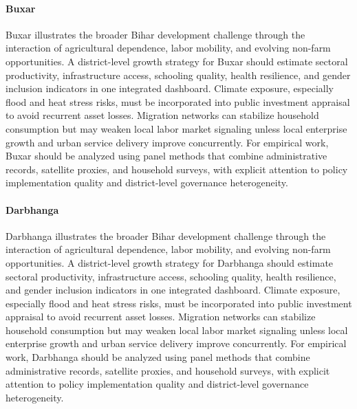 \documentclass[preprint,12pt]{elsarticle}
\begin{document}
\paragraph{Buxar} Buxar illustrates the broader Bihar development challenge through the interaction of agricultural dependence, labor mobility, and evolving non-farm opportunities. A district-level growth strategy for Buxar should estimate sectoral productivity, infrastructure access, schooling quality, health resilience, and gender inclusion indicators in one integrated dashboard. Climate exposure, especially flood and heat stress risks, must be incorporated into public investment appraisal to avoid recurrent asset losses. Migration networks can stabilize household consumption but may weaken local labor market signaling unless local enterprise growth and urban service delivery improve concurrently. For empirical work, Buxar should be analyzed using panel methods that combine administrative records, satellite proxies, and household surveys, with explicit attention to policy implementation quality and district-level governance heterogeneity.

\paragraph{Darbhanga} Darbhanga illustrates the broader Bihar development challenge through the interaction of agricultural dependence, labor mobility, and evolving non-farm opportunities. A district-level growth strategy for Darbhanga should estimate sectoral productivity, infrastructure access, schooling quality, health resilience, and gender inclusion indicators in one integrated dashboard. Climate exposure, especially flood and heat stress risks, must be incorporated into public investment appraisal to avoid recurrent asset losses. Migration networks can stabilize household consumption but may weaken local labor market signaling unless local enterprise growth and urban service delivery improve concurrently. For empirical work, Darbhanga should be analyzed using panel methods that combine administrative records, satellite proxies, and household surveys, with explicit attention to policy implementation quality and district-level governance heterogeneity.
\end{document}

